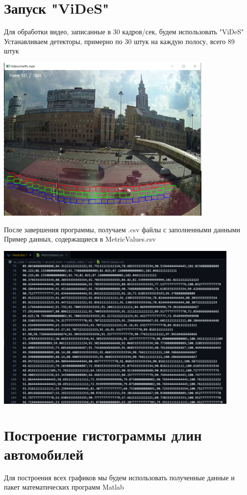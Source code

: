 \documentclass[a4paper,12pt]{article}
\begin{document}
\section*{Запуск "ViDeS"}
Для обработки видео, записанные в 30 кадров/сек, будем использовать "ViDeS"\\
Устанавливаем детекторы, примерно по 30 штук на каждую полосу, всего 89 штук
\begin{center}
\includegraphics[width=0.8\textwidth]{images/vides_89_detectors.jpg}
\end{center}
После завершения программы, получаем .csv файлы с заполненными данными
Пример данных, содержащиеся в MetricValues.csv
\begin{center}
\includegraphics[width=0.9\textwidth]{images/vides_data.jpg}
\end{center}


\newpage
\section*{Построение гистограммы длин автомобилей}
Для построения всех графиков мы будем использовать полученные данные и пакет математических программ Matlab
\end{document}
